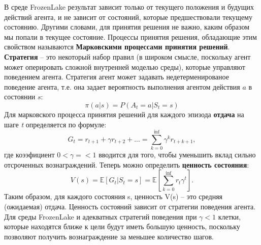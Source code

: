 \documentclass[fleqn, a4paper, 14pt]{article}
\begin{document}
	В среде FrozenLake результат зависит только от текущего положения и будущих действий агента, и не зависит от состояний, которые предшествовали текущему состоянию. Другими словами, для принятия решения не важно, каким образом мы попали в текущее состояние. Процессы принятия решения, обладающие этим свойством называются \textbf{Марковскими процессами принятия решений}.
	\textbf{Стратегия} -- это некоторый набор правил (в широком смысле, поскольку агент может оперировать сложной внутренней моделью среды), которые управляют поведением агента.
	Стратегия агент может задавать недетерменированое поведение агента, т.е. она задает вероятность выполнения агентом действия $a$ в состоянии $s$:
	\begin{equation}
	\pi (a|s)=P(A_t=a|S_t=s)
	\end{equation} 
	Для марковского процесса принятия решений для каждого эпизода \textbf{отдача} на шаге \textit{t} определяется по формуле:
	\begin{equation}
		G_t = r_{t+1} + \gamma r_{t+2} + ... = \sum_{k=0}^{\inf} \gamma^k r_{t+k+1},
	\end{equation}
	где коээфициент $0 < \gamma =< 1$ вводится для того, чтобы уменьшить вклад сильно отсроченных вознаграждений. Теперь можно определить \textbf{ценность состояния}: 
	\begin{equation}
	V(s) = \mathbb{E}[G_t|S_t=s] = \mathbb{E}[\sum_{k=0}^{\inf}r_t \gamma^t].
	\end{equation}
	Таким образом, для каждого состояния s, ценность V(s) -- это средняя (ожидаемая) отдача. Ценность состояний зависит от стратегии поведения агента. 
	Для среды FrozenLake и адекватных стратегий поведения при $\gamma < 1$ клетки, которые находятся ближе к цели будут иметь большую ценность, поскольку позволяют получить вознаграждение за меньшее количество шагов.\\
	
\end{document}
